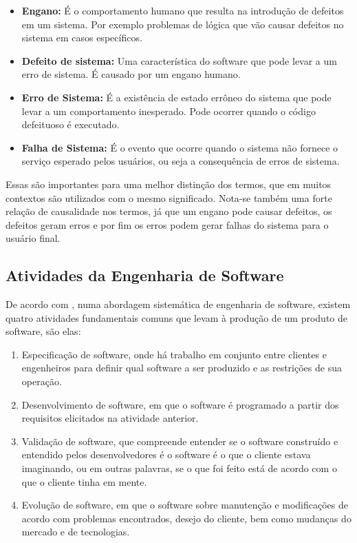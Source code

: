 \begin{itemize}
    \item \textbf{Engano:} É o comportamento humano que resulta na introdução de defeitos em um sistema. Por exemplo problemas de lógica que vão causar defeitos no sistema em casos específicos.

    \item \textbf{Defeito de sistema:} Uma característica do software que pode levar a um erro de sistema. É causado por um engano humano.
    
    \item \textbf{Erro de Sistema:} É a existência de estado errôneo do sistema que pode levar a um comportamento inesperado. Pode ocorrer quando o código defeituoso é executado.

    \item \textbf{Falha de Sistema:} É o evento que ocorre quando o sistema não fornece o serviço esperado pelos usuários, ou seja a consequência de erros de sistema.
\end{itemize}

Essas são importantes para uma melhor distinção dos termos, que em muitos contextos são utilizados com o mesmo significado. Nota-se também uma forte relação de causalidade nos termos, já que um engano pode causar defeitos, os defeitos geram erros e por fim os erros podem gerar falhas do sistema para o usuário final.

\subsection{Atividades da Engenharia de Software}
De acordo com \citeauthor{Sommerville2007}, numa abordagem sistemática de engenharia de software, existem quatro atividades fundamentais comuns que levam à produção de um produto de software, são elas:

\begin{enumerate}
    \item Especificação de software, onde há trabalho em conjunto entre clientes e engenheiros para definir qual software a ser produzido e as restrições de sua operação.
    \item Desenvolvimento de software, em que o software é programado a partir dos requisitos elicitados na atividade anterior.
    \item Validação de software, que compreende entender se o software construído e entendido pelos desenvolvedores é o software é o que o cliente estava imaginando, ou em outras palavras, se o que foi feito está de acordo com o que o cliente tinha em mente.
    \item Evolução de software, em que o software sobre manutenção e modificações de acordo com problemas encontrados, desejo do cliente, bem como mudanças do mercado e de tecnologias.
\end{enumerate}

